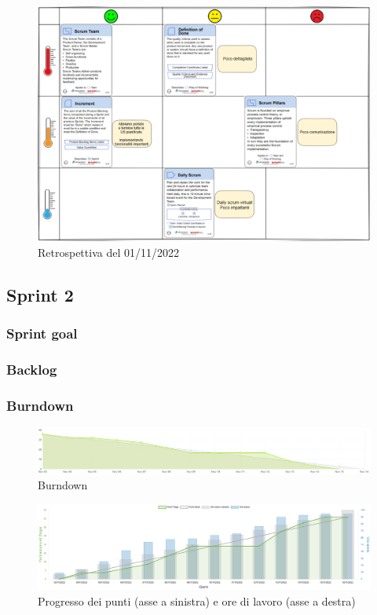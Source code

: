 \documentclass[11pt]{article}
\begin{document}
\begin{figure}[H]
    \centering
    \includegraphics[width=15cm]{./img/sprint1/retrospettiva.png}
    \caption{Retrospettiva del 01/11/2022}
\end{figure}


\subsection{Sprint 2}
\subsubsection{Sprint goal}

\subsubsection{Backlog}

\subsubsection{Burndown}
\begin{figure}[H]
    \centering
    \includegraphics[width=15cm]{./img/sprint2/burndown.png}
    \caption{Burndown}
\end{figure}
\begin{figure}[H]
    \centering
    \includegraphics[width=15cm]{./img/sprint2/worktime.png}
    \caption{Progresso dei punti (asse a sinistra) e ore di lavoro (asse a destra)}
\end{figure}
\end{document}
